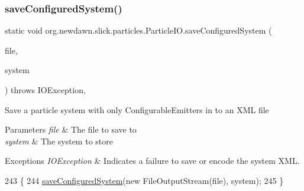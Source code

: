\mbox{\label{classorg_1_1newdawn_1_1slick_1_1particles_1_1_particle_i_o_a064f618a541d57771f9ce35d558763a1}} 
\subsubsection{\texorpdfstring{save\+Configured\+System()}{saveConfiguredSystem()}\hspace{0.1cm}{\footnotesize\ttfamily [1/2]}}
{\footnotesize\ttfamily static void org.\+newdawn.\+slick.\+particles.\+Particle\+I\+O.\+save\+Configured\+System (\begin{DoxyParamCaption}\item[{File}]{file,  }\item[{\mbox{\hyperlink{classorg_1_1newdawn_1_1slick_1_1particles_1_1_particle_system}{Particle\+System}}}]{system }\end{DoxyParamCaption}) throws I\+O\+Exception\hspace{0.3cm}{\ttfamily [inline]}, {\ttfamily [static]}}

Save a particle system with only Configurable\+Emitters in to an X\+ML file


\begin{DoxyParams}{Parameters}
{\em file} & The file to save to \\
\hline
{\em system} & The system to store \\
\hline
\end{DoxyParams}

\begin{DoxyExceptions}{Exceptions}
{\em I\+O\+Exception} & Indicates a failure to save or encode the system X\+ML. \\
\hline
\end{DoxyExceptions}

\begin{DoxyCode}
243                                \{
244         \mbox{\hyperlink{classorg_1_1newdawn_1_1slick_1_1particles_1_1_particle_i_o_a064f618a541d57771f9ce35d558763a1}{saveConfiguredSystem}}(\textcolor{keyword}{new} FileOutputStream(file), system);
245     \}
\end{DoxyCode}
\mbox{\label{classorg_1_1newdawn_1_1slick_1_1particles_1_1_particle_i_o_a20968832144b21a7ae3d390dac4f5406}} 

